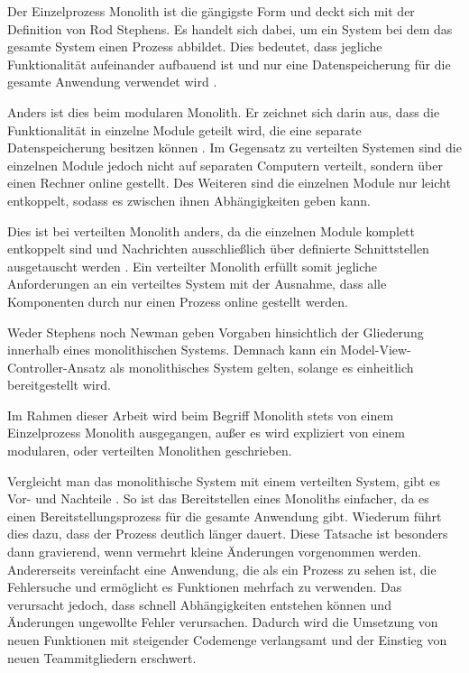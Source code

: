 Der Einzelprozess Monolith ist die gängigste Form und deckt sich mit der Definition von Rod Stephens. Es handelt sich dabei, um ein System bei dem das gesamte System einen Prozess abbildet. Dies bedeutet, dass jegliche Funktionalität aufeinander aufbauend ist und nur eine Datenspeicherung für die gesamte Anwendung verwendet wird \parencite[vgl.][Kap. 2.2.1]{newman_monolith_2019}.

Anders ist dies beim modularen Monolith. Er zeichnet sich darin aus, dass die Funktionalität in einzelne Module geteilt wird, die eine separate Datenspeicherung besitzen können \parencite[vgl.][Kap. 2.2.2]{newman_monolith_2019}. Im Gegensatz zu verteilten Systemen sind die einzelnen Module jedoch nicht auf separaten Computern verteilt, sondern über einen Rechner online gestellt. Des Weiteren sind die einzelnen Module nur leicht entkoppelt, sodass es zwischen ihnen Abhängigkeiten geben kann.

Dies ist bei verteilten Monolith anders, da die einzelnen Module komplett entkoppelt sind und Nachrichten ausschließlich über definierte Schnittstellen ausgetauscht werden \parencite[vgl.][S. 116]{starke_effektive_2015}. Ein verteilter Monolith erfüllt somit jegliche Anforderungen an ein verteiltes System mit der Ausnahme, dass alle Komponenten durch nur einen Prozess online gestellt werden.

Weder Stephens noch Newman geben Vorgaben hinsichtlich der Gliederung innerhalb eines monolithischen Systems. Demnach kann ein Model-View-Controller-Ansatz als monolithisches System gelten, solange es einheitlich bereitgestellt wird.

Im Rahmen dieser Arbeit wird beim Begriff Monolith stets von einem Einzelprozess Monolith ausgegangen, außer es wird expliziert von einem modularen, oder verteilten Monolithen geschrieben.

Vergleicht man das monolithische System mit einem verteilten System, gibt es Vor- und Nachteile \parencite[vgl.][Kap. 2.2.4 und Kap. 2.2.5]{newman_monolith_2019}. So ist das Bereitstellen eines Monoliths einfacher, da es einen Bereitstellungsprozess für die gesamte Anwendung gibt. Wiederum führt dies dazu, dass der Prozess deutlich länger dauert. Diese Tatsache ist besonders dann gravierend, wenn vermehrt kleine Änderungen vorgenommen werden. Andererseits vereinfacht eine Anwendung, die als ein Prozess zu sehen ist, die Fehlersuche und ermöglicht es Funktionen mehrfach zu verwenden. Das verursacht jedoch, dass schnell Abhängigkeiten entstehen können und Änderungen ungewollte Fehler verursachen. Dadurch wird die Umsetzung von neuen Funktionen mit steigender Codemenge verlangsamt und der Einstieg von neuen Teammitgliedern erschwert.

